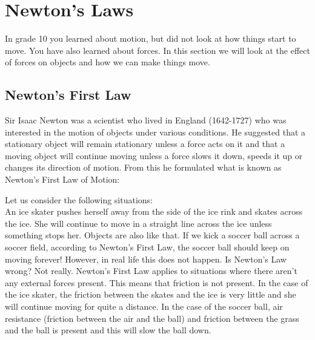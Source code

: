 \section{Newton's Laws}
In grade 10 you learned about motion, but did not look at how things start to move. You have also learned about forces. In this section we will look at the effect of forces on objects and how we can make things move. 

\subsection{Newton's First Law}
Sir Isaac Newton was a scientist who lived in England (1642-1727) who was interested in the motion of objects under various conditions. He suggested that a stationary object will remain stationary unless a force acts on it and that a moving object will continue moving unless a force slows it down, speeds it up or changes its direction of motion. From this he formulated what is known as Newton's First Law of Motion:


Let us consider the following situations:\\

An ice skater pushes herself away from the side of the ice rink and skates across the ice. She will continue to move in a straight line across the ice unless something stops her. Objects are also like that. If we kick a soccer ball across a soccer field, according to Newton's First Law, the soccer ball should keep on moving forever! However, in real life this does not happen. Is Newton's Law wrong? Not really. Newton's First Law applies to situations where there aren't any external forces present. This means that friction is not present. In the case of the ice skater, the friction between the skates and the ice is very little and she will continue moving for quite a distance. In the case of the soccer ball, air resistance (friction between the air and the ball) and friction between the grass and the ball is present and this will slow the ball down. 

